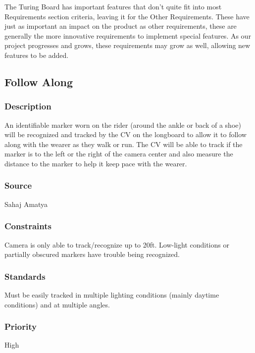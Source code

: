 The Turing Board has important features that don't quite fit into most Requirements section criteria, leaving it for the Other Requirements. These have just as important an impact on the product as other requirements, these are generally the more innovative requirements to implement special features. As our project progresses and grows, these requirements may grow as well, allowing new features to be added.

\subsection{Follow Along}
\subsubsection{Description}
An identifiable marker worn on the rider (around the ankle or back of a shoe) will be recognized and tracked by the CV on the longboard to allow it to follow along with the wearer as they walk or run. The CV will be able to track if the marker is to the left or the right of the camera center and also measure the distance to the marker to help it keep pace with the wearer.
\subsubsection{Source}
Sahaj Amatya
\subsubsection{Constraints}
Camera is only able to track/recognize up to 20ft. Low-light conditions or partially obscured markers have trouble being recognized.
\subsubsection{Standards}
Must be easily tracked in multiple lighting conditions (mainly daytime conditions) and at multiple angles.
\subsubsection{Priority}
High